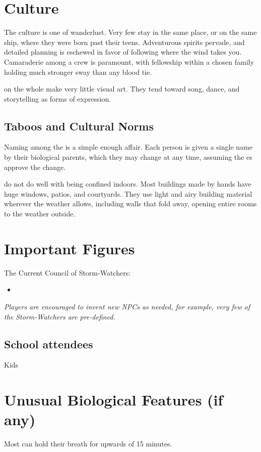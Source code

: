 \documentclass[blue]{GL2020}
\begin{document}
\section*{Culture}
The \pShip{} culture is one of wanderlust. Very few \pShippies{} stay in the same place, or on the same ship, where they were born past their teens. Adventurous spirits pervade, and detailed planning is eschewed in favor of following where the wind takes you. Camaraderie among a crew is paramount, with fellowship within a chosen family holding much stronger sway than any blood tie.

\pShippies{} on the whole make very little visual art. They tend toward song, dance, and storytelling as forms of expression.

\subsection*{Taboos and Cultural Norms}
Naming among the \pShip{} is a simple enough affair. Each person is given a single name by their biological parents, which they may change at any time, assuming the \cEbb{\God}es approve the change.

\pShippies{} do not do well with being confined indoors. Most buildings made by \pShip{} hands have huge windows, patios, and courtyards. They use light and airy building material wherever the weather allows, including walls that fold away, opening entire rooms to the weather outside.

\section*{Important Figures}
The Current Council of Storm-Watchers:
\begin{itemize}
	\item \cLoud{}
\end{itemize}

\emph{Players are encouraged to invent new NPCs as needed, for example, very few of the Storm-Watchers are pre-defined.}

\subsection*{School attendees}

Kids




\section*{Unusual Biological Features (if any)}
Most \pShippies{} can hold their breath for upwards of 15 minutes.
\end{document}
